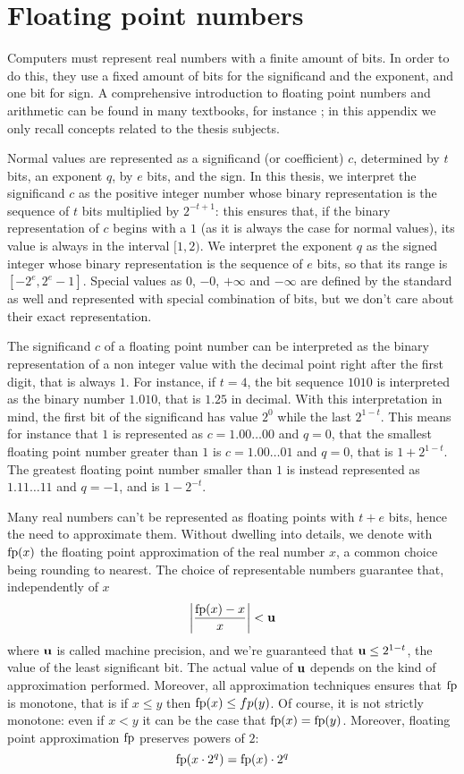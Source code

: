 \chapter{Floating point numbers}\label{appA:fp-numbers}
Computers must represent real numbers with a finite amount of bits. In order to do this, they use a fixed amount of bits for the significand and the exponent, and one bit for sign. A comprehensive introduction to floating point numbers and arithmetic can be found in many textbooks, for instance \cite{overton-num-analysis-book}; in this appendix we only recall concepts related to the thesis subjects.

Normal values are represented as a significand (or coefficient) $c$, determined by $t$ bits, an exponent $q$, by $e$ bits, and the sign. In this thesis, we interpret the significand $c$ as the positive integer number whose binary representation is the sequence of $t$ bits multiplied by $2^{-t+1}$: this ensures that, if the binary representation of $c$ begins with a $1$ (as it is always the case for normal values), its value is always in the interval $[1, 2)$. We interpret the exponent $q$ as the signed integer whose binary representation is the sequence of $e$ bits, so that its range is $[-2^e, 2^e - 1]$.
Special values as $0$, $-0$, $+\infty$ and $-\infty$ are defined by the standard as well and represented with special combination of bits, but we don't care about their exact representation.

The significand $c$ of a floating point number can be interpreted as the binary representation of a non integer value with the decimal point right after the first digit, that is always $1$. For instance, if $t = 4$, the bit sequence $1010$ is interpreted as the binary number $1.010$, that is $1.25$ in decimal. With this interpretation in mind, the first bit of the significand has value $2^0$ while the last $2^{1-t}$.
This means for instance that $1$ is represented as $c = 1.00 \dots 00$ and $q = 0$, that the smallest floating point number greater than $1$ is $c = 1.00 \dots 01$ and $q = 0$, that is $1 + 2^{1-t}$. The greatest floating point number smaller than $1$ is instead represented as $1.11 \dots 11$ and $q = -1$, and is $1 - 2^{-t}$.

Many real numbers can't be represented as floating points with $t + e$ bits, hence the need to approximate them. Without dwelling into details, we denote with $\text{fp}(x)$ the floating point approximation of the real number $x$, a common choice being rounding to nearest. The choice of representable numbers guarantee that, independently of $x$
\[
\left\lvert \frac{\text{fp}(x) - x}{x} \right\rvert < \textbf{u}
\]
where $\textbf{u}$ is called machine precision, and we're guaranteed that $\textbf{u} \le 2^{1-t}$, the value of the least significant bit. The actual value of $\textbf{u}$ depends on the kind of approximation performed. Moreover, all approximation techniques ensures that $\text{fp}$ is monotone, that is if $x \le y$ then $\text{fp}(x) \le fp(y)$. Of course, it is not strictly monotone: even if $x < y$ it can be the case that $\text{fp}(x) = \text{fp}(y)$.
Moreover, floating point approximation $\text{fp}$ preserves powers of $2$:
\[
\text{fp}(x \cdot 2^q) = \text{fp}(x) \cdot 2^q
\]

